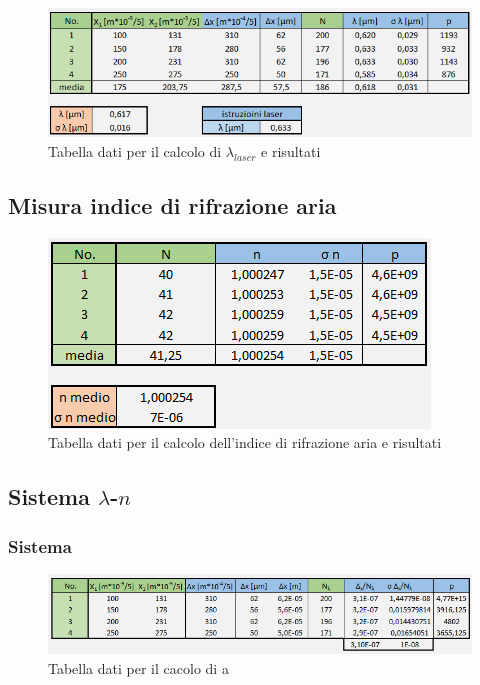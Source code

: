 \documentclass{article}
\begin{document}
\begin{figure}[h!]
  \centering
  \includegraphics[width=1\linewidth]{IM tabella lambda}
  \caption{Tabella dati per il calcolo di $\lambda_{laser}$ e risultati}
\end{figure}

\clearpage 

\subsection{Misura indice di rifrazione aria}


\begin{figure}[h!]
  \centering
  \includegraphics[width=0.6\linewidth]{IM tabella n}
  \caption{Tabella dati per il calcolo dell'indice di rifrazione aria e risultati}
\end{figure}

\subsection{Sistema $\lambda$-$n$}
\subsubsection{Sistema}

\begin{figure}[h!]
  \centering
  \includegraphics[width=1\linewidth]{IM tabella a}
  \caption{Tabella dati per il cacolo di a}
\end{figure}
\end{document}
